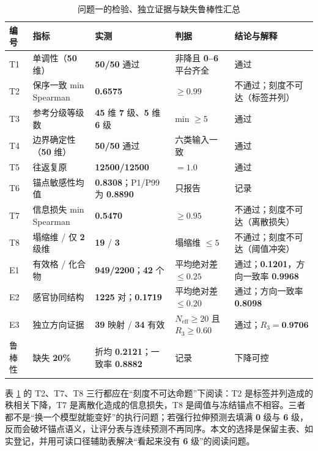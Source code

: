 \begin{table}[H]
\centering
{}
\begin{tabularx}{\textwidth}{@{}p{}p{}p{}p{}X@{}}
\toprule
编号 & 指标 & 实测 & 判据 & 结论与解释 \\
\midrule
T1 & 单调性（\textbf{50} 维） & \textbf{50/50} 通过 & 非降且 \textbf{0--6} 平台齐全 & 通过 \\
T2 & 保序一致 min Spearman & \textbf{0.6575} & $\ge 0.99$ & 不通过；刻度不可达（标签并列） \\
T3 & 参考分级等级数 & \textbf{45} 维 \textbf{7} 级、\textbf{5} 维 \textbf{6} 级 & min $\ge 5$ & 通过 \\
T4 & 边界确定性（\textbf{50} 维） & \textbf{50/50} 通过 & 六类输入一致 & 通过 \\
T5 & 往返复原 & \textbf{12500/12500} & $=1.0$ & 通过 \\
T6 & 锚点敏感性均值 & \textbf{0.8308}；P1/P99 为 \textbf{0.8890} & 只报告 & 记录 \\
T7 & 信息损失 min Spearman & \textbf{0.5470} & $\ge 0.95$ & 不通过；刻度不可达（离散损失） \\
T8 & 塌缩维 / 仅 \textbf{2} 级维 & \textbf{19} / \textbf{3} & 塌缩维 $\le 5$ & 不通过；刻度不可达（阈值冲突） \\
E1 & 有效格 / 化合物 & \textbf{949/2200}；\textbf{42} 个 & 平均绝对差 $\le 0.25$ & 通过；\textbf{0.1201}，方向一致率 \textbf{0.9968} \\
E2 & 感官协同结构 & \textbf{1225} 对；\textbf{0.1719} & 平均绝对差 $\le 0.20$ & 通过；方向一致率 \textbf{0.8098} \\
E3 & 独立方向证据 & \textbf{39} 映射 / \textbf{34} 有效 & $N_{\mathrm{eff}}\ge 20$ 且 $R_3\ge 0.60$ & 通过；$R_3=\textbf{0.9706}$ \\
鲁棒性 & 缺失 \textbf{20\%} & 折均 \textbf{0.2121}；一致率 \textbf{0.8882} & 记录 & 下降可控 \\
\bottomrule
\end{tabularx}
\caption{问题一的检验、独立证据与缺失鲁棒性汇总}
\label{tab:q1-check}
\end{table}

表 \ref{tab:q1-check} 的 T2、T7、T8 三行都应在“刻度不可达命题”下阅读：T2 是标签并列造成的秩相关下降，T7 是离散化造成的信息损失，T8 是阈值与冻结锚点不相容。三者都不是“换一个模型就能变好”的执行问题；若强行拉伸预测去填满 \textbf{0} 级与 \textbf{6} 级，反而会破坏锚点语义，让评分表与连续预测不再同序。本文的选择是保留主表、如实登记，并用可读口径辅助表解决“看起来没有 \textbf{6} 级”的阅读问题。

